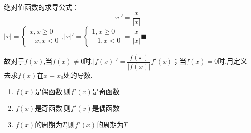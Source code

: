 绝对值函数的求导公式：
\begin{equation*}
    \left\lvert x\right\rvert '=\frac{x}{\left\lvert x\right\rvert }
\end{equation*}
\zheng $\left\lvert x\right\rvert =
    \begin{cases}
        x,x \geqslant 0\\
        -x,x <0
    \end{cases},
    \left\lvert x\right\rvert '=
    \begin{cases}
        1,x \geqslant 0\\
        -1,x <0
    \end{cases}=
    \dfrac{x}{\left\lvert x\right\rvert }$\hfill$\blacksquare $

故对于$f(x)$,当$f(x)\neq 0$时,$\left\lvert f(x)\right\rvert '=\dfrac{f(x)}{\left\lvert f(x)\right\rvert }f'(x)$；当$f(x)= 0$时,用定义去求$f(x)$在$x=x_0$处的导数.

\begin{theorem}[导函数的性质]
    \begin{enumerate}
        \item $f(x)$是偶函数,则$f'(x)$是奇函数
        \item $f(x)$是奇函数,则$f'(x)$是偶函数
        \item $f(x)$的周期为$T$,则$f'(x)$的周期为$T$
    \end{enumerate}
\end{theorem}

